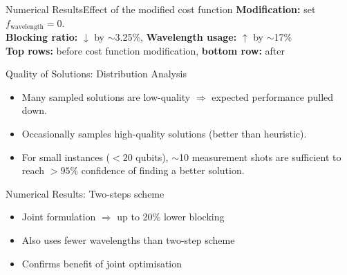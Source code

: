 \begin{frame}{Numerical Results}{Effect of the modified cost function}
    \textbf{Modification:} set $f_{\text{wavelength}} =0$. \\
    \textbf{Blocking ratio:} $\downarrow$ by $\sim$3.25\%, \textbf{Wavelength usage:} $\uparrow$ by $\sim$17\%\\
    \textbf{Top rows:} before cost function modification, \textbf{bottom row:} after
    

\end{frame}

\begin{frame}{Quality of Solutions: Distribution Analysis}
\begin{itemize}
    \item Many sampled solutions are low-quality $\Rightarrow$ expected performance pulled down.
    \item Occasionally samples high-quality solutions (better than heuristic).
    \item For small instances ($<20$ qubits), $\sim$10 measurement shots are sufficient to reach $>95\%$ confidence of finding a better solution.
\end{itemize}

\end{frame}


\begin{frame}{Numerical Results: Two-steps scheme}
\begin{itemize}
        \item Joint formulation $\Rightarrow$ up to 20\% lower blocking
        \item Also uses fewer wavelengths than two-step scheme
        \item Confirms benefit of joint optimisation
\end{itemize}

\end{frame}
